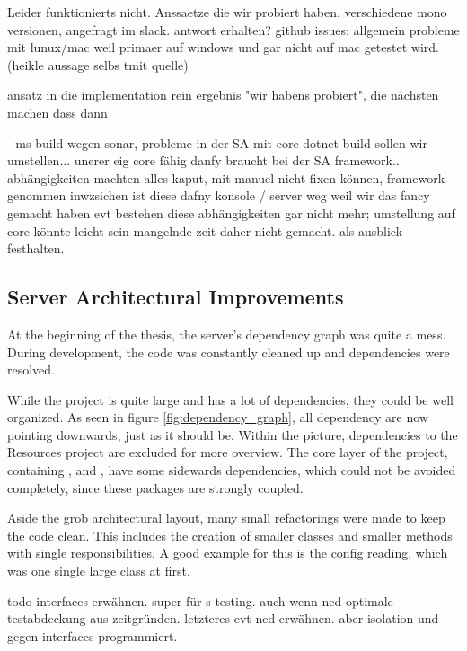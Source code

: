 Leider funktionierts nicht.
Anssaetze die wir probiert haben. verschiedene mono versionen, angefragt im slack. antwort erhalten?
github issues: allgemein probleme mit lunux/mac weil primaer auf windows und gar nicht auf mac getestet wird. (heikle aussage selbs tmit quelle)

ansatz in die implementation rein
ergebnis "wir habens probiert", die nächsten machen dass dann

- ms build wegen sonar, probleme in der SA mit core
dotnet build sollen wir umstellen...
unerer eig core fähig
danfy braucht bei der SA framework.. abhängigkeiten machten alles kaput, mit manuel nicht fixen können, framework genommen
inwzsichen ist diese dafny konsole / server weg weil wir das fancy gemacht haben
evt bestehen diese abhängigkeiten gar nicht mehr; umstellung auf core könnte leicht sein
mangelnde zeit daher nicht gemacht. als ausblick festhalten.

\cite{sa}
\cite{mono-slack}
\cite{mono-git}


\subsection{Server Architectural Improvements}
At the beginning of the thesis, the server's dependency graph was quite a mess.
During development, the code was constantly cleaned up and dependencies were resolved.

While the project is quite large and has a lot of dependencies, they could be well organized.
As seen in figure \ref{fig:dependency_graph}, all dependency are now pointing downwards, just as it should be.
Within the picture, dependencies to the Resources project are excluded for more overview.
The core layer of the project, containing ,  and , have some sidewards dependencies, which could not be avoided completely, since these packages are strongly coupled.

Aside the grob architectural layout, many small refactorings were made to keep the code clean.
This includes the creation of smaller classes and smaller methods with single responsibilities.
A good example for this is the config reading, which was one single large class at first. 

todo interfaces erwähnen. super für s testing. auch wenn ned optimale testabdeckung aus zeitgründen. letzteres evt ned erwähnen.
aber isolation und gegen interfaces programmiert. 

